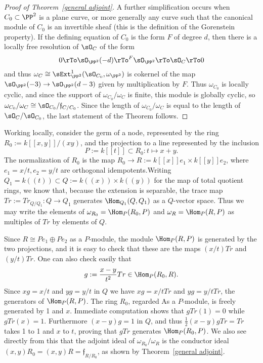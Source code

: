\begin{proof}[Proof of Theorem~\ref{general adjoint}]
A further simplification occurs when $C_0\subset \PP^2$ is a plane curve, or more generally any 
curve such that the canonical module of $C_0$ is an invertible sheaf (this is the definition of the Gorenstein property).
If the defining equation of 
$C_0$ is the form $F$ of degree $d$, then there is a locally free resolution of  $\sO_C$ of the form
$$
0\rTo \sO_{\PP^2}(-d) \rTo^F \sO_{\PP^2} \rTo \sO_C \rTo 0
$$
and thus $\omega_C \cong \sExt^1_{\PP^2}(\sO_{C_0}, \omega_{\PP^2})$
is cokernel of the map $\sO_{\PP^2}(-3) \to \sO_{\PP^2}(d-3)$ given by multiplication by $F$. Thus
$\omega_{C_0}$ is locally cyclic, and  since the support of $\omega_{C_0}/\omega_C$ is finite, this module is
 globally cyclic, so
$\omega_{C_0}/\omega_C \cong \sO_{C_0}/\mathfrak f_{C/C_0}$.
Since the length of $\omega_{C_0}/\omega_C$ is equal to the length of 
$\sO_{C}/\sO_{C_0}$, the last statement of the Theorem follows.
\end{proof}

\begin{example}
 Working locally, consider the germ of a node, represented by the ring $R_0:= k[[x,y]]/(xy)$, and
 the projection to a line represented by the inclusion 
 $$
 P:= k[[t]] \subset R_0: t\mapsto x+y.
 $$
 The normalization of $R_0$ is the map $R_0 \to R := k[[x]]e_1\times k[[y]]e_2$,
 where $e_1= x/t, e_2= y/t$ are orthogonal idempotents.Writing 
 $Q_1 = k((t)) \subset Q:= k((x))\times k((y))$
 for the map of total quotient rings, we know that, because the extension is separable, the trace map
 $Tr := Tr_{Q/Q_1}: Q \to Q_1$ generates $\Hom_{Q_1}(Q,Q_1)$ as a $Q$-vector space. Thus we may write the
 elements of $\omega_{R_0} = \Hom_{P}(R_0,P)$ and $\omega_R = \Hom_{P}(R,P)$ as
 multiples of $Tr$ by elements of $Q$.
 
 Since $R \cong Pe_1\oplus Pe_2$ as a $P$-module, the module $\Hom_P(R,P)$ is
 generated by the two projections, and it is easy to check that these are the maps
 $(x/t)Tr$ and $(y/t)Tr$. One can also check easily that 
 $$
 g := \frac{x-y}{t^2} Tr \in \Hom_P(R_0,R).
 $$
 Since
$xg = x/t$ and $yg = y/t$ in $Q$ we have
 $xg = x/tTr$ and $yg= y/tTr$, the generators of $\Hom_{P}(R,P)$. 
 The ring $R_0$, regarded As a $P$-module, is freely generated by 1 and $x$.
 Immediate computation shows that $gTr(1) = 0$ while $gTr(x) = 1$.
 Furthermore $(x-y)g = 1$ in $Q$,  and thus $\frac{1}{2}(x-y)gTr = Tr$ takes 1 to 1
 and $x$ to $t$, proving that $gTr$  generates
 $\Hom_P(R_0,P)$. We also see directly from this that the adjoint ideal
 of $\omega_{R_0}/\omega_R$ is the conductor ideal $(x,y)R_0 = (x,y)R = \mathfrak f_{R/R_0}$,
 as shown by  Theorem~\ref{general adjoint}. 
\end{example}

